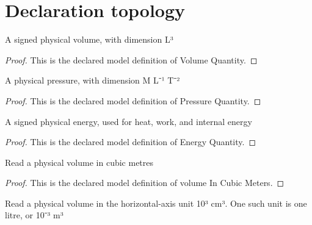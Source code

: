 \section{Declaration topology}
\begin{definition}
  \label{def:physics:phyx-mini-0356:phyxminiproblems-problemphyxmini0356-volumequantity}
  A signed physical volume, with dimension L³
\end{definition}
\begin{proof}
  This is the declared model definition of Volume Quantity.
\end{proof}
\begin{definition}
  \label{def:physics:phyx-mini-0356:phyxminiproblems-problemphyxmini0356-pressurequantity}
  A physical pressure, with dimension M L⁻¹ T⁻²
\end{definition}
\begin{proof}
  This is the declared model definition of Pressure Quantity.
\end{proof}
\begin{definition}
  \label{def:physics:phyx-mini-0356:phyxminiproblems-problemphyxmini0356-energyquantity}
  A signed physical energy, used for heat, work, and internal energy
\end{definition}
\begin{proof}
  This is the declared model definition of Energy Quantity.
\end{proof}
\begin{definition}
  \label{def:physics:phyx-mini-0356:phyxminiproblems-problemphyxmini0356-volumeincubicmeters}
  Read a physical volume in cubic metres
\end{definition}
\begin{proof}
  This is the declared model definition of volume In Cubic Meters.
\end{proof}
\begin{definition}
  \label{def:physics:phyx-mini-0356:phyxminiproblems-problemphyxmini0356-volumeinthousandsofcubiccentimeters}
  Read a physical volume in the horizontal-axis unit 10³ cm³. One such unit is one litre, or 10⁻³ m³
\end{definition}
